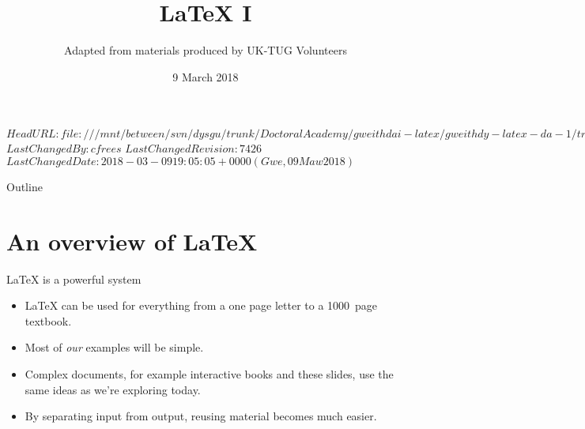 \svnidlong
{$HeadURL: file:///mnt/between/svn/dysgu/trunk/DoctoralAcademy/gweithdai-latex/gweithdy-latex-da-1/training.tex $}
{$LastChangedBy: cfrees $}
{$LastChangedRevision: 7426 $}
{$LastChangedDate: 2018-03-09 19:05:05 +0000 (Gwe, 09 Maw 2018) $}



\AtBeginDocument
{
  \renewcommand*{\LaTeX}{LaTeX}
  \renewcommand*{\LaTeXe}{LaTeX2e}
  \renewcommand*{\TeX}{TeX}
}

\title{\LaTeX{} I}
\subtitle{Adapted from materials produced by UK-TUG Volunteers}
\date{ 9 March 2018}




\begin{frame}
  \titlepage
\end{frame}

\maketitle


\tableofcontents

%
{
  \begin{frame}{Outline}
	\tableofcontents
  \end{frame}
}

\section{An overview of \LaTeX{}}

\begin{frame}{\LaTeX{} is a powerful system}

  \begin{itemize}
	\item \LaTeX{} can be used for everything from a one page letter to a 1000~page textbook.
	\item Most of \emph{our} examples will be simple.
	\item Complex documents, for example interactive books and these slides, use the same ideas as we're exploring today.
	\item By separating input from output, reusing material becomes much easier.
  \end{itemize}

\end{frame}

